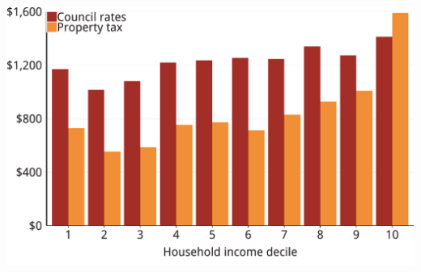\documentclass[tikz]{standalone}\usepackage[]{graphicx}\usepackage[]{color}
\newenvironment{knitrout}{}{} %
\begin{document}
\begin{knitrout}
\color{fgcolor}
\includegraphics[width=11.000in,height=7.00in]{./Property-taxes/atlas/figure/PROP-Figure10-1} 

\end{knitrout}
\end{document}
